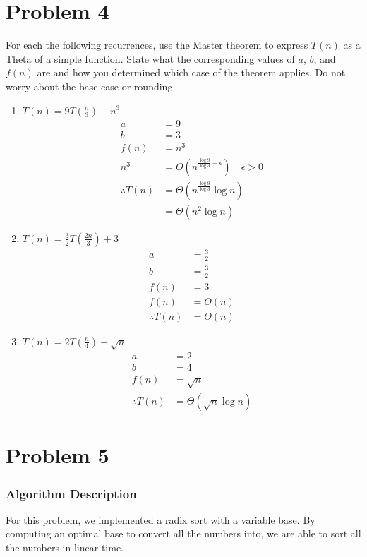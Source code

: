 \documentclass[letterpaper, 12pt]{math}
\begin{document}
\section*{Problem 4}
For each the following recurrences, use the Master theorem to express \( T(n) \)
as a Theta of a simple function. State what the corresponding values of \( a \),
\( b \), and \( f(n) \) are and how you determined which case of the theorem
applies. Do not worry about the base case or rounding.
\begin{enumerate}
  \item \( T(n) = 9T(\frac{n}{3})+n^3 \)
  \begin{align*}
    a &= 9 \\
    b &= 3 \\
    f(n) &= n^3 \\
    n^3 &= O(n^{\frac{\log9}{\log3}-\epsilon})\quad \epsilon > 0 \\
    \therefore T(n) &= \Theta(n^{\frac{\log9}{\log3}}\log n) \\
    &= \Theta(n^2\log n)
  \end{align*}
  \item \( T(n) = \frac{3}{2}T(\frac{2n}{3})+3 \)
  \begin{align*}
    a &= \frac{3}{2} \\
    b &= \frac{3}{2} \\
    f(n) &= 3 \\
    f(n) &= O(n) \\
    \therefore T(n) &= \Theta(n)
  \end{align*}
  \item \( T(n) = 2T(\frac{n}{4}) + \sqrt{n} \)
  \begin{align*}
    a &= 2 \\
    b &= 4 \\
    f(n) &= \sqrt{n} \\
    \therefore T(n) &= \Theta(\sqrt{n}\log n)
  \end{align*}
\end{enumerate}

\section*{Problem 5}

\subsubsection*{Algorithm Description}
For this problem, we implemented a radix sort with a variable base. By computing
an optimal base to convert all the numbers into, we are able to sort all the
numbers in linear time.
\end{document}
